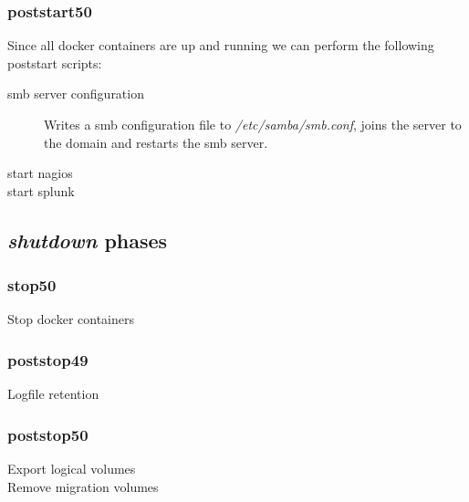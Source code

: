 			\subsubsection{poststart50}
			Since all docker containers are up and running we can perform the following poststart scripts:
			\begin{description}
				\item[smb server configuration] Writes a smb configuration file to \emph{/etc/samba/smb.conf}, joins the server to the domain and restarts the smb server.
				\item[start nagios] 
				\item[start splunk] 
			\end{description}
		\subsection{\emph{shutdown} phases}
			\subsubsection{stop50}
			\begin{description}
				\item[Stop docker containers]
			\end{description}
			\subsubsection{poststop49}
			\begin{description}
				\item[Logfile retention]
			\end{description}
			\subsubsection{poststop50}
			\begin{description}
				\item[Export logical volumes]
				\item[Remove migration volumes]
			\end{description}
